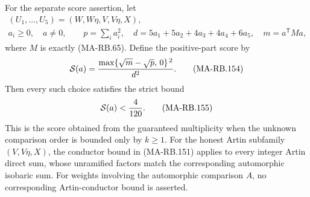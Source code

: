 For the separate score assertion, let
\[
 \begin{gathered}
 (U_1,\ldots,U_5)=(W,W\eta,V,V\eta,X),\\
 a_i\ge0,\quad a\ne0,\qquad
 p=\sum_i a_i^2,\quad
 d=5a_1+5a_2+4a_3+4a_4+6a_5,\quad
 m=a^{\mathsf T}Ma ,
 \end{gathered}
 \tag{MA-RB.153}
\]
where \(M\) is exactly (MA-RB.65).  Define the positive-part
score by
\[
 {\cal S}(a)=
       \frac{\max\{\sqrt m-\sqrt p,\,0\}^{\,2}}{d^2}.
 \tag{MA-RB.154}
\]
Then every such choice satisfies the strict bound
\[
                         {\cal S}(a)<\frac4{120}.
 \tag{MA-RB.155}
\]
This is the score obtained from the guaranteed multiplicity
when the unknown comparison order is bounded only by \(k\ge1\).
For the honest Artin subfamily \((V,V\eta,X)\), the conductor
bound in (MA-RB.151) applies to every integer Artin direct
sum, whose unramified factors match the corresponding
automorphic isobaric sum.
For weights involving the automorphic comparison \(A\),
no corresponding Artin-conductor bound is asserted.

